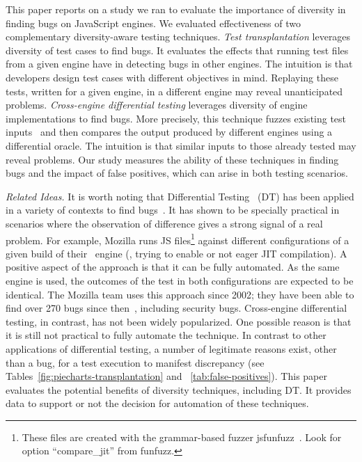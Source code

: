 \documentclass[10pt,conference,anonymous]{IEEEtran}
\begin{document}
This paper reports on a study we ran to evaluate the importance of
diversity in finding bugs on JavaScript engines. We evaluated
effectiveness of two complementary diversity-aware testing
techniques. \emph{Test transplantation} leverages diversity of test
cases to find bugs. It evaluates the effects that running \js{} test
files from a given engine have in detecting bugs in other engines. The
intuition is that developers design test cases with different
objectives in mind. Replaying these tests, written for a given engine,
in a different engine may reveal unanticipated
problems. \emph{Cross-engine differential testing} leverages diversity of engine implementations to find
bugs. More precisely, this technique fuzzes existing test
inputs~\cite{fuzz-testing-history} and then compares the output
produced by different engines using a differential oracle. The
intuition is that similar inputs to those already tested may reveal
problems. Our study measures the ability of these techniques in
finding bugs and the impact of false positives, which
can arise in both testing scenarios.



\emph{Related Ideas.}  It is worth noting that Differential
Testing~\cite{Brumley-etal-ss07} (DT) has been applied in a variety of
contexts to find
bugs~\cite{Yang-etal-pldi11,Chen-etal-fse2015,Argyros-etla-ccs16,Chen-etal-pldi16,petsios-etal-sp2017,SivakornAPKJ17,Zhang:2017:ATD:3097368.3097448}.
It has shown to be specially practical in scenarios where the
observation of difference gives a strong signal of a real problem. For
example, Mozilla runs JS files\footnote{These files are created with
  the grammar-based fuzzer jsfunfuzz~\cite{jsfunfuzz}. Look for option
  ``compare\_jit'' from funfuzz.} against different configurations of
a given build of their \smonkey\ engine (\eg{}, trying to enable or
not eager JIT compilation). A positive aspect of the approach is that
it can be fully automated. As the same engine is used, the outcomes of
the test in both configurations are expected to be identical. The
Mozilla team uses this approach since 2002; they have been able to
find over 270 bugs since then~\cite{jsfunfuzz-at-mozilla}, including
security bugs. Cross-engine differential testing, in contrast, has not
been widely popularized. One possible reason is that it is still not
practical to fully automate the technique. In contrast to other
applications of differential testing, a number of legitimate reasons
exist, other than a bug, for a test execution to manifest discrepancy
(see Tables~\ref{fig:piecharts-transplantation} and
~\ref{tab:false-positives}). This paper evaluates the potential
benefits of diversity techniques, including DT. It provides data to
support or not the decision for automation of these techniques.
\end{document}
